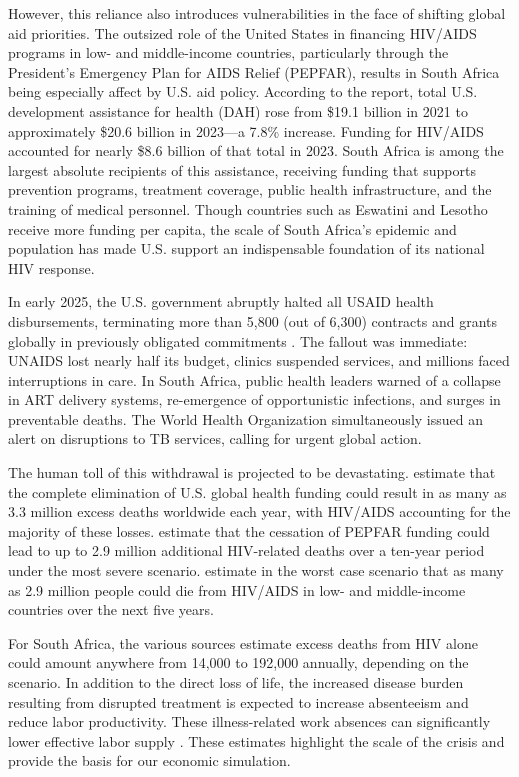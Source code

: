 \documentclass[letterpaper,12pt]{article}
\theoremstyle{definition}
\begin{document}
\begin{spacing}{1.5}
However, this reliance also introduces vulnerabilities in the face of shifting global aid priorities.  The outsized role of the United States in financing HIV/AIDS programs in low- and middle-income countries, particularly through the President's Emergency Plan for AIDS Relief (PEPFAR), results in South Africa being especially affect by U.S. aid policy. According to the \citet{FGH2023} report, total U.S. development assistance for health (DAH) rose from \$19.1 billion in 2021 to approximately \$20.6 billion in 2023—a 7.8\% increase. Funding for HIV/AIDS accounted for nearly \$8.6 billion of that total in 2023. South Africa is among the largest absolute recipients of this assistance, receiving funding that supports prevention programs, treatment coverage, public health infrastructure, and the training of medical personnel. Though countries such as Eswatini and Lesotho receive more funding per capita, the scale of South Africa's epidemic and population has made U.S. support an indispensable foundation of its national HIV response.

In early 2025, the U.S. government abruptly halted all USAID health disbursements, terminating more than 5,800 (out of 6,300) contracts and grants globally in previously obligated commitments \citep{Cohen2025}. The fallout was immediate: UNAIDS lost nearly half its budget, clinics suspended services, and millions faced interruptions in care. In South Africa, public health leaders warned of a collapse in ART delivery systems, re-emergence of opportunistic infections, and surges in preventable deaths. The World Health Organization simultaneously issued an alert on disruptions to TB services, calling for urgent global action.

The human toll of this withdrawal is projected to be devastating. \citet{KS2025} estimate that the complete elimination of U.S. global health funding could result in as many as 3.3 million excess deaths worldwide each year, with HIV/AIDS accounting for the majority of these losses. \citet{Gandhi2025} estimate that the cessation of PEPFAR funding could lead to up to 2.9 million additional HIV-related deaths over a ten-year period under the most severe scenario.  estimate in the worst case scenario that as many as 2.9 million people could die from HIV/AIDS in low- and middle-income countries over the next five years.

For South Africa, the various sources estimate excess deaths from HIV alone could amount anywhere from 14,000 to 192,000 annually, depending on the scenario. In addition to the direct loss of life, the increased disease burden resulting from disrupted treatment is expected to increase absenteeism and reduce labor productivity. These illness-related work absences can significantly lower effective labor supply \citep{Keogh2024,Panda2024}. These estimates highlight the scale of the crisis and provide the basis for our economic simulation.


\end{spacing}
\end{document}
